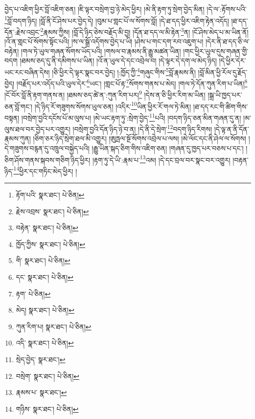 བྱེད་པ་འཇིག་ཕྱིར་བློ་འཇིག་ཅན། །ཇི་ལྟར་བསྲེག་བྱ་ཉེ་མེད་ཕྱིར། །མེ་ནི་རྟག་ཏུ་སྲེག་བྱེད་མིན། །དེ་ལ་:རྟོགས་པའི་\footnote{རྟོག་པའི་  སྣར་ཐང་།  པེ་ཅིན། }བློ་བདག་ཉིད། །བློ་ནི་ངོ་ཤེས་པར་བྱེད་དེ། །བུམ་པ་གླང་པོ་ལ་སོགས་བློ། །དེ་ཐ་དད་ཕྱིར་འཇིག་རྟེན་འདོད། །ཐ་དད་དོན་:རྗེས་འབྲང་\footnote{རྗེས་འབྲས་  སྣར་ཐང་།  པེ་ཅིན། }རྣམས་ཀྱིས། །བློ་དེ་ཉིད་ཅེས་བརྗོད་མི་བྱ། །དོན་ཐ་དད་ལ་མི་རྟེན་\footnote{བརྟེན་  སྣར་ཐང་།  པེ་ཅིན། }ན། །ངོ་ཤེས་མེད་པ་མ་ཡིན་ནོ། །འོ་ན་གླང་པོ་སོགས་སྟོང་པའི། །ས་ལ་སྒྲོ་འདོགས་བྱེད་པ་ཡི། །ཤེས་པ་གང་དག་རབ་འཇུག་པ། །དེར་ནི་ཐ་དད་ཅི་ལ་བརྟེན། །གལ་ཏེ་ཡུལ་གཞན་སོགས་ཡོད་པའི། །གསལ་བ་རྣམས་ནི་རྒྱུ་མཚན་ཡིན། །གང་ཕྱིར་ཡུལ་དུས་གཞན་གྱི་བདག །ཐམས་ཅད་དུ་ནི་དམིགས་པ་ཡིན། །འོ་ན་ཡུལ་དེ་དང་འབྲེལ་བ། །དེ་ལྟར་དེ་དག་ལ་མེད་ཉིད། །དེ་ཕྱིར་དེར་ཡང་རང་བཞིན་དེས། །ཅི་ཕྱིར་དེ་ལྟར་སྣང་བར་བྱེད། །:ཁྱོད་ཀྱི་\footnote{ཁྱོད་ཀྱིས་  སྣར་ཐང་།  པེ་ཅིན། }གཞུང་གིས་\footnote{གི་  སྣར་ཐང་།  པེ་ཅིན། }བློ་རྣམས་ནི། །བློ་མིན་ཕྱི་རོལ་དུ་རྗོད་བྱེད། །བརྗོད་པར་འདོད་པའི་ཡུལ་དེར་\footnote{དང་  སྣར་ཐང་།  པེ་ཅིན། }ཡང་། །གླང་པོ་རྟ་\footnote{རྟག་  པེ་ཅིན། }སོགས་གནས་པ་མེད། །གལ་ཏེ་དོན་ཀུན་རིག་པ་ཡིན།\footnote{མེད།  སྣར་ཐང་།  པེ་ཅིན། } །ངོ་བོར་བློ་ནི་རྟག་གནས་ན། །ཐམས་ཅད་ཚེ་ན་:ཀུན་རིག་པར།\footnote{ཀུན་རིག་པ།  སྣར་ཐང་།  པེ་ཅིན། } །དེས་ན་ཅི་ཕྱིར་རིག་མ་ཡིན། །སྒྲ་ཡི་ཁྱད་པར་ཅན་བློ་གང་། །དེ་ཉིད་རོ་གཟུགས་སོགས་ཡུལ་ཅན། །འདིར་\footnote{འདི་  སྣར་ཐང་།  པེ་ཅིན། }ཡིན་ཕྱིར་རོ་གལ་ཏེ་མིན། །ཐ་དད་རང་གི་ཚིག་གིས་བསྟན། །བསྲེག་བྱའི་དངོས་པོ་མ་ལུས་པ། །མེ་ཡང་རྟག་ཏུ་:སྲེག་བྱེད་\footnote{སྲེད་བྱེད་  སྣར་ཐང་། }པའི། །བདག་ཉིད་ཅན་མིན་གཞན་དུ་ན། །མ་ལུས་ཐལ་བར་བྱེད་པར་འགྱུར། །བསྲེག་བྱའི་དོན་ཉིད་ཉེ་བ་ན། །དེ་ནི་དེ་སྲེག་\footnote{བསྲེག་  སྣར་ཐང་།  པེ་ཅིན། }བདག་ཉིད་རིགས། །དེ་ལྟ་ན་ནི་དོན་རྣམས་ཀུན། །ཅིག་ཅར་ཉིད་སྲེག་ཐལ་མི་འགྱུར། །ཨུཏྤལ་སྔོ་སོགས་འབྲེལ་པ་ལས། །མེ་ལོང་དང་ནི་ཤེལ་ལ་སོགས། །དེ་གཟུགས་བརྙན་དུ་འཁྲུལ་བསྐྱེད་པའི། །རྒྱུ་ཡིན་སྐད་ཅིག་གིས་འཇིག་ཅན། །གཞན་དུ་ཁྱད་པར་བཅས་པ་དང་། །ཅིག་ཤོས་གནས་སྐབས་གཅིག་ཉིད་ཕྱིར། །རྟག་ཏུ་དེ་ཡི་:རྣམ་པ་\footnote{རྣམས་པ་  སྣར་ཐང་། }འམ། །དེ་དང་བྲལ་བར་སྣང་བར་འགྱུར། །བརྟན་ཉིད་\footnote{གཉིས་  སྣར་ཐང་།  པེ་ཅིན། }ཕྱིར་དང་གཏིང་མེད་ཕྱིར། །
